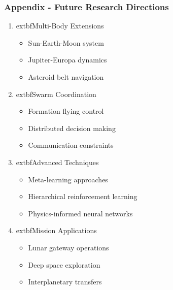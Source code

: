 \documentclass[
    11pt, %
    aspectratio=169, %
]{beamer}
\begin{document}
\begin{frame}[noframenumbering]
\label{Future Work}
	\frametitle{Appendix - Future Research Directions}
	
	\begin{enumerate}
		\item 	extbf{Multi-Body Extensions}
		\begin{itemize}
			\item Sun-Earth-Moon system
			\item Jupiter-Europa dynamics
			\item Asteroid belt navigation
		\end{itemize}
		
		\item 	extbf{Swarm Coordination}
		\begin{itemize}
			\item Formation flying control
			\item Distributed decision making
			\item Communication constraints
		\end{itemize}
		
		\item 	extbf{Advanced Techniques}
		\begin{itemize}
			\item Meta-learning approaches
			\item Hierarchical reinforcement learning
			\item Physics-informed neural networks
		\end{itemize}
		
		\item 	extbf{Mission Applications}
		\begin{itemize}
			\item Lunar gateway operations
			\item Deep space exploration
			\item Interplanetary transfers
		\end{itemize}
	\end{enumerate}
\end{frame}
\end{document}
